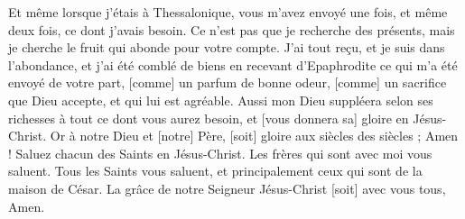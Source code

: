 \begin{multicols}{2}
Et même lorsque j'étais à Thessalonique, vous m'avez envoyé une fois, et même deux fois, ce dont j'avais besoin.
Ce n'est pas que je recherche des présents, mais je cherche le fruit qui abonde pour votre compte.
J'ai tout reçu, et je suis dans l'abondance, et j'ai été comblé de biens en recevant d'Epaphrodite ce qui m'a été envoyé de votre part, [comme] un parfum de bonne odeur, [comme] un sacrifice que Dieu accepte, et qui lui est agréable.
Aussi mon Dieu suppléera selon ses richesses à tout ce dont vous aurez besoin, et [vous donnera sa] gloire en Jésus-Christ.
Or à notre Dieu et [notre] Père, [soit] gloire aux siècles des siècles ; Amen !
Saluez chacun des Saints en Jésus-Christ. Les frères qui sont avec moi vous saluent.
Tous les Saints vous saluent, et principalement ceux qui sont de la maison de César.
La grâce de notre Seigneur Jésus-Christ [soit] avec vous tous, Amen.
\PPE{}
\end{multicols}
